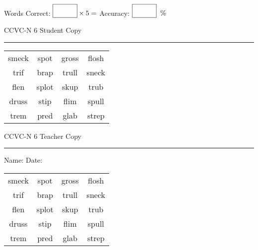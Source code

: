 \documentclass{memoir}
\begin{document}
\small

Words Correct: $\fbox{\phantom{\huge 100}} \times 5 = $ Accuracy: $\fbox{\phantom{\huge 100}}\;\; \%$ 

\vfill

\newpage


\footnotesize \noindent
CCVC-N 6 \hfill Student Copy
\smallskip
\hrule

\Large

\setlength{\tabcolsep}{14pt}
\def\arraystretch{3}

{\selectfont


\begin{vplace}[0.5]
\begin{center}
\begin{tabular}{cccc}
smeck & spot & gross                    & flosh \\
trif & brap               & trull & sneck \\
flen & splot & skup & trub \\
druss & stip & flim            & spull \\
trem & pred & glab & strep \\
\end{tabular}
\end{center}
\end{vplace}

}

\newpage

\footnotesize \noindent
CCVC-N 6 \hfill Teacher Copy
\smallskip
\hrule

\small

\vfill

\noindent
Name: \underline{\hspace{1.75in}} \hfill Date: \underline{\hspace{1in}}

\Large

{\selectfont


\begin{vplace}[0.5]
\begin{center}
\begin{tabular}{cccc}
smeck & spot & gross                    & flosh \\
trif & brap               & trull & sneck \\
flen & splot & skup & trub \\
druss & stip & flim            & spull \\
trem & pred & glab & strep \\
\end{tabular}
\end{center}
\end{vplace}



}
\end{document}
